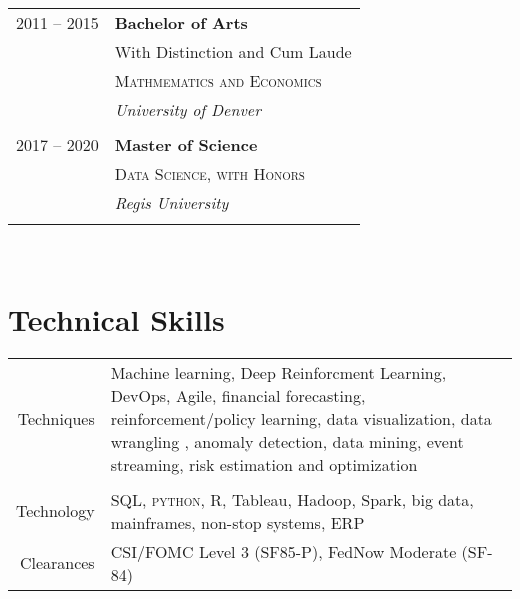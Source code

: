 \documentclass[10pt]{article} %
\begin{document}
\begin{minipage}[t]{0.44\textwidth}
\begin{tabular}{rl}

2011 -- 2015  & \textbf{Bachelor of Arts} \\ 
& \small{With Distinction and Cum Laude}\\
& \textsc{Mathmematics and Economics} \\ 
& \textit{University of Denver}\\
&\\
2017 -- 2020  & \textbf{Master of Science} \\ 
& \textsc{Data Science, with Honors} \\ 
& \textit{Regis University}\\
&\\	 


\end{tabular}\\[10pt]







\section{Technical Skills} 

\begin{tabular}{rl}
\parbox{0.3\textwidth}{Techniques}
& \parbox{0.5\textwidth}{Machine learning, Deep Reinforcment Learning,  DevOps, Agile, financial forecasting,  reinforcement/policy learning, data visualization,  data wrangling , anomaly detection, data mining, event streaming, risk estimation and optimization}\\ 
& \\
\parbox{0.3\textwidth}{Technology}
& \parbox{0.5\textwidth}{SQL, \textsc{python}, R, Tableau, Hadoop, Spark, big data, mainframes, non-stop systems,  ERP  }\\
\parbox{0.3\textwidth}{Clearances}
& \parbox{0.5\textwidth}{CSI/FOMC Level 3 (SF85-P), FedNow Moderate (SF-84)  }\\
\end{tabular}






\end{minipage} %
\end{document}
